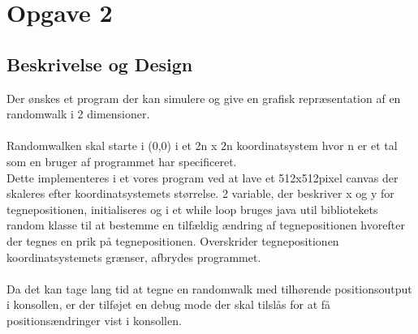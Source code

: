 \section{Opgave 2}
\subsection{Beskrivelse og Design}
Der ønskes et program der kan simulere og give en grafisk repræsentation af en randomwalk i 2 dimensioner. \\
\\
Randomwalken skal starte i (0,0) i et 2n x 2n koordinatsystem hvor n er et tal som en bruger af programmet har specificeret. \\
Dette implementeres i et vores program ved at lave et 512x512pixel canvas der skaleres efter koordinatsystemets størrelse. 2 variable, der beskriver x og y for tegnepositionen, initialiseres og i et while loop bruges java util bibliotekets random klasse til at bestemme en tilfældig ændring af tegnepositionen hvorefter der tegnes en prik på tegnepositionen. Overskrider tegnepositionen koordinatsystemets grænser, afbrydes programmet.
\\
\\
Da det kan tage lang tid at tegne en randomwalk med tilhørende positionsoutput i konsollen, er der tilføjet en debug mode der skal tilslås for at få positionsændringer vist i konsollen.
